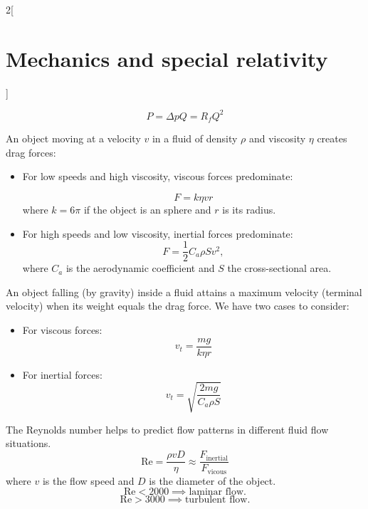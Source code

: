\documentclass[class=article,10pt,crop=false]{standalone}
\begin{document}
\begin{multicols}{2}[\section{Mechanics and special relativity}]
\begin{concept}
\begin{itemize}
\end{itemize}
\end{concept}
\begin{concept}
$$P=\Delta pQ=R_fQ^2$$
\end{concept}
\begin{concept}
An object moving at a velocity $v$ in a fluid of density $\rho$ and viscosity $\eta$ creates drag forces:
\begin{itemize}
    \item For low speeds and high viscosity, viscous forces predominate:\par 
    $$F=k\eta vr$$
    where $k=6\pi$ if the object is an sphere and $r$ is its radius.
    \item For high speeds and low viscosity, inertial forces predominate:
    $$F=\frac{1}{2}C_a\rho Sv^2,$$
    where $C_a$ is the aerodynamic coefficient and $S$ the cross-sectional area.
\end{itemize}
\end{concept}
\begin{concept}
An object falling (by gravity) inside a fluid attains a maximum velocity (terminal velocity) when its weight equals the drag force. We have two cases to consider:
\begin{itemize}
    \item For viscous forces: $$v_t=\frac{mg}{k\eta r}$$
    \item For inertial forces: $$v_t=\sqrt{\frac{2mg}{C_a\rho S}}$$
\end{itemize}
\end{concept}
\begin{concept}
The Reynolds number helps to predict flow patterns in different fluid flow situations.
$$\text{Re}=\frac{\rho vD}{\eta}\approx\frac{F_{\text{inertial}}}{F_{\text{vicous}}}$$
where $v$ is the flow speed and $D$ is the diameter of the object. 
$$\text{Re}<2000\implies\text{laminar flow}.$$
$$\text{Re}>3000\implies\text{turbulent flow}.$$
\end{concept}


\end{multicols}
\end{document}
